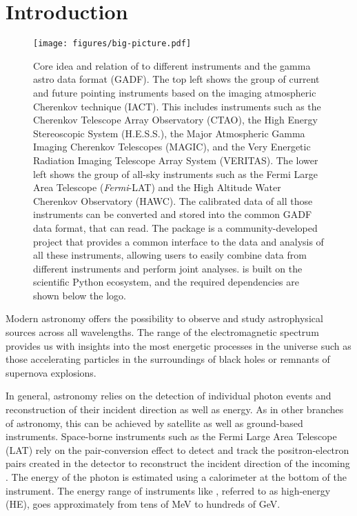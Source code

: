 \documentclass[longauth]{aa}
\begin{document}

\maketitle

\section{Introduction}
\label{sec:introduction}
%
\begin{figure*}[t]
	\centering
	\texttt{[image: figures/big-picture.pdf]}
	\caption{
		Core idea and relation of \gammapy to different \gammaray instruments
		and the gamma astro data format (GADF). The top left shows the
		group of current and future pointing instruments based on the 
		imaging atmospheric Cherenkov technique (IACT). This includes
		instruments such as the Cherenkov Telescope Array Observatory (CTAO),
		the High Energy Stereoscopic System (H.E.S.S.), the
		Major Atmospheric Gamma Imaging Cherenkov Telescopes (MAGIC),
		and the Very Energetic Radiation Imaging Telescope Array System (VERITAS).
		The lower left shows the group of all-sky instruments such as the
		Fermi Large Area Telescope (\textit{Fermi}-LAT) and the High Altitude
		Water Cherenkov Observatory (HAWC). The calibrated data of all those
		instruments can be converted and stored into the common GADF data format, that \gammapy can read.
		The \gammapy package is a community-developed project that
		provides a common interface to the data and analysis of all
		these \gammaray instruments, allowing users to easily combine data from
		different instruments and perform joint analyses.
		\gammapy is built on the scientific Python ecosystem, and the required dependencies
		are shown below the \gammapy logo.
	}
	\label{fig:big_picture}

\end{figure*}
%
Modern astronomy offers the possibility to observe and study astrophysical sources across
all wavelengths. The \gammaray range of the electromagnetic spectrum 
provides us with insights into the most energetic processes in the universe such as
those accelerating particles in the surroundings of black holes or remnants of
supernova explosions.

In general, \gammaray astronomy relies on the detection of individual 
photon events and reconstruction of their incident direction as well
as energy. As in other branches of astronomy, this can be
achieved by satellite as well as ground-based \gammaray instruments.
Space-borne instruments such as the Fermi Large Area Telescope (LAT)
rely on the pair-conversion effect to detect \gammarays and track
the positron-electron pairs created in the detector to reconstruct the incident direction 
of the incoming \gammaray. The energy of the photon is estimated using a calorimeter
at the bottom of the instrument. The energy range of instruments like \fermi \citep{Atwood2009}, referred to as
high-energy (HE), goes approximately from tens of \si{MeV} to hundreds of \si{GeV}. 
\end{document}
